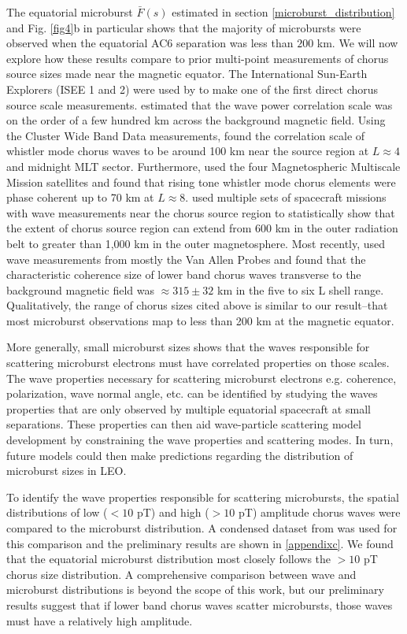 \documentclass[draft]{agujournal2019}
\begin{document}
The equatorial microburst $\bar{F}(s)$ estimated in section \ref{microburst_distribution} and Fig. \ref{fig4}b in particular shows that the majority of microbursts were observed when the equatorial AC6 separation was less than $200$ km. We will now explore how these results compare to prior multi-point measurements of chorus source sizes made near the magnetic equator. The International Sun-Earth Explorers (ISEE 1 and 2) were used by  to make one of the first direct chorus source scale measurements.  estimated that the wave power correlation scale was on the order of a few hundred km across the background magnetic field. Using the Cluster Wide Band Data measurements,  found the correlation scale of whistler mode chorus waves to be around 100 km near the source region at $L \approx 4$ and midnight MLT sector. Furthermore,  used the four Magnetospheric Multiscale Mission satellites and found that rising tone whistler mode chorus elements were phase coherent up to 70 km at $L \approx 8$.  used multiple sets of spacecraft missions with wave measurements near the chorus source region to statistically show that the extent of chorus source region can extend from 600 km in the outer radiation belt to greater than 1,000 km in the outer magnetosphere. Most recently,  used wave measurements from mostly the Van Allen Probes and found that the characteristic coherence size of lower band chorus waves transverse to the background magnetic field was $\approx 315 \pm 32$ km in the five to six L shell range. Qualitatively, the range of chorus sizes cited above is similar to our result--that most microburst observations map to less than 200 km at the magnetic equator.

More generally, small microburst sizes shows that the waves responsible for scattering microburst electrons must have correlated properties on those scales. The wave properties necessary for scattering microburst electrons e.g. coherence, polarization, wave normal angle, etc. can be identified by studying the waves properties that are only observed by multiple equatorial spacecraft at small separations. These properties can then aid wave-particle scattering model development by constraining the wave properties and scattering modes. In turn, future models could then make predictions regarding the distribution of microburst sizes in LEO. 

To identify the wave properties responsible for scattering microbursts, the spatial distributions of low ($< 10$ pT) and high ($> 10$ pT) amplitude chorus waves were compared to the microburst distribution. A condensed dataset from  was used for this comparison and the preliminary results are shown in \ref{appendixc}. We found that the equatorial microburst distribution most closely follows the $> 10$ pT chorus size distribution. A comprehensive comparison between wave and microburst distributions is beyond the scope of this work, but our preliminary results suggest that if lower band chorus waves scatter microbursts, those waves must have a relatively high amplitude.
\end{document}
